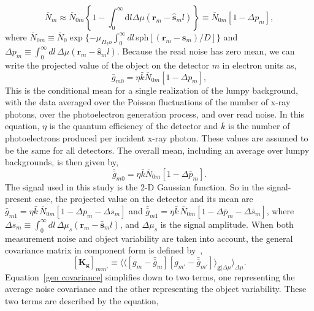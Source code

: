 %
\begin{equation}
\label{xrayeqnapprox}
\overline{N}_m \approx \overline{N}_{0m} \left\{1-\int_{0}^{\infty} \mathrm{d}l \Delta\mu(\mathbf{r}_m - \mathbf{\hat{s}}_ml)\right\} \equiv \overline{N}_{0m}[1-\Delta p_m],
\end{equation}
%
where $\overline{N}_{0m} \equiv \overline{N}_0 \exp\{-\mu_{H_2o} \int_0^{\infty} dl\,$sph$[(\mathbf{r}_m-\mathbf{s}_m )/D] \} $ and $\Delta p_m \equiv \int_0^{\infty} dl \, \Delta \mu(\mathbf{r}_m-\mathbf{\hat{s}}_m l)$.  Because the read noise has zero mean, we can write the projected value of the object on the detector $m$ in electron units as,
%
\begin{equation}
\label{gbar}
\bar{g}_{m0} = \eta \bar{k}\overline{N}_{0m}[1-\Delta p_m],
\end{equation}
% 
This is the conditional mean for a single realization of the lumpy background, with the data averaged over the Poisson fluctuations of the number of x-ray photons, over the photoelectron generation process, and over read noise.  In this equation, $\eta$ is the quantum efficiency of the detector and $\bar{k}$ is the number of photoelectrons produced per incident x-ray photon.  These values are assumed to be the same for all detectors.  The overall mean, including an average over lumpy backgrounds, is then given by,
%
\begin{equation}
\label{gdoublebar}
\bar{\bar{g}}_{m0} = \eta\bar{k}\overline{N}_{0m}[1-\Delta \bar{p}_m].
\end{equation}
%
The signal used in this study is the 2-D Gaussian function.  So in the signal-present case, the projected value on the detector and its mean are $\bar{g}_{m1} = \eta \bar{k}\, \overline{N}_{0m}[1 - \Delta p_m - \Delta s_m]$ and $ \bar{\bar{g}}_{m1} = \eta\bar{k}\, \overline{N}_{0m}[1 - \Delta \bar{p}_m - \Delta\bar{s}_m]$,  where $\Delta s_m \equiv \int_0^{\infty}dl \, \Delta \mu_s (\mathbf{r}_m - \mathbf{\hat{s}}_m l)$, and $\Delta\mu_s$ is the signal amplitude.
When both measurement noise and object variability are taken into account, the general covariance matrix in component form is defined by~\citep{Barrett2004},
%
\begin{equation}
\label{gen covariance}
[\mathbf{K_g}]_{mm'} \equiv \langle \langle[g_m-\bar{\bar{g}}_m][g_{m'}-\bar{\bar{g}}_{m'}]\rangle_{\mathbf{g}|\Delta\mu} \rangle_{\Delta\mu}.
\end{equation}
%
Equation~\ref{gen covariance} simplifies down to two terms, one representing the average noise covariance and the other representing the object variability.  These two terms are described by the equation,
